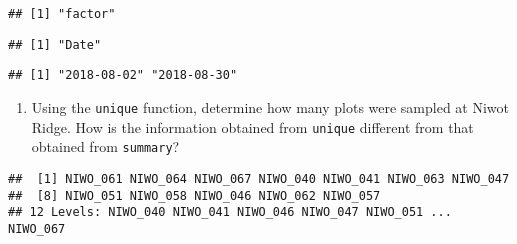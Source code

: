 \documentclass[]{article}
\newenvironment{Shaded}{\begin{snugshade}}{\end{snugshade}}
\newcommand{\CommentTok}[1]{\textcolor[rgb]{0.56,0.35,0.01}{\textit{#1}}}
\newcommand{\DataTypeTok}[1]{\textcolor[rgb]{0.13,0.29,0.53}{#1}}
\newcommand{\KeywordTok}[1]{\textcolor[rgb]{0.13,0.29,0.53}{\textbf{#1}}}
\newcommand{\NormalTok}[1]{#1}
\newcommand{\OperatorTok}[1]{\textcolor[rgb]{0.81,0.36,0.00}{\textbf{#1}}}
\newcommand{\StringTok}[1]{\textcolor[rgb]{0.31,0.60,0.02}{#1}}
\providecommand{\tightlist}{%
  \setlength{\itemsep}{0pt}\setlength{\parskip}{0pt}}
\begin{document}
\begin{verbatim}
## [1] "factor"
\end{verbatim}

\begin{Shaded}
\end{Shaded}

\begin{verbatim}
## [1] "Date"
\end{verbatim}

\begin{Shaded}
\end{Shaded}

\begin{verbatim}
## [1] "2018-08-02" "2018-08-30"
\end{verbatim}

\begin{enumerate}
\def\labelenumi{\arabic{enumi}.}
\setcounter{enumi}{12}
\tightlist
\item
  Using the \texttt{unique} function, determine how many plots were
  sampled at Niwot Ridge. How is the information obtained from
  \texttt{unique} different from that obtained from \texttt{summary}?
\end{enumerate}

\begin{Shaded}
\end{Shaded}

\begin{verbatim}
##  [1] NIWO_061 NIWO_064 NIWO_067 NIWO_040 NIWO_041 NIWO_063 NIWO_047
##  [8] NIWO_051 NIWO_058 NIWO_046 NIWO_062 NIWO_057
## 12 Levels: NIWO_040 NIWO_041 NIWO_046 NIWO_047 NIWO_051 ... NIWO_067
\end{verbatim}
\end{document}
